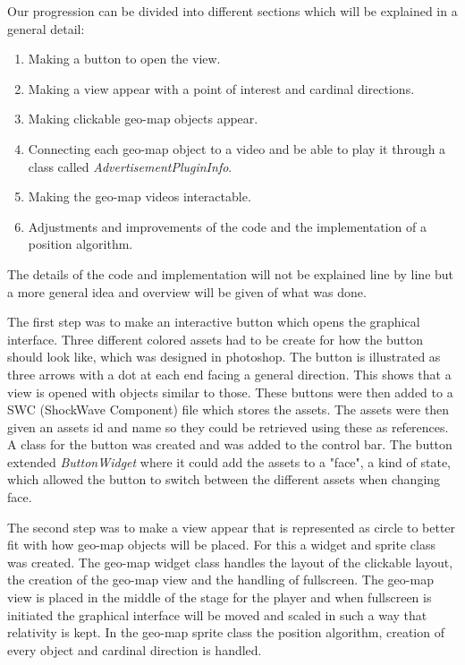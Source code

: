 Our progression can be divided into different sections which will be explained in a general detail:

\begin{enumerate}
\item Making a button to open the view.

\item Making a view appear with a point of interest and cardinal directions.

\item Making clickable geo-map objects appear.

\item Connecting each geo-map object to a video and be able to play it through a class called \textit{AdvertisementPluginInfo}.

\item Making the geo-map videos interactable.


\item Adjustments and improvements of the code and the implementation of a position algorithm. 
\end{enumerate}

The details of the code and implementation will not be explained line by line but a more general idea and overview will be given of what was done.

The first step was to make an interactive button which opens the graphical interface. Three different colored assets had to be create for how the button should look like, which was designed in photoshop. The button is illustrated as three arrows with a dot at each end facing a general direction. This shows that a view is opened with objects similar to those. These buttons were then added to a SWC (ShockWave Component) file which stores the assets. The assets were then given an assets id and name so they could be retrieved using these as references. A class for the button was created and was added to the control bar. The button extended \textit{ButtonWidget} where it could add the assets to a "face", a kind of state, which allowed the button to switch between the different assets when changing face. 

The second step was to make a view appear that is represented as circle to better fit with how geo-map objects will be placed. For this a widget and sprite class was created. The geo-map widget class handles the layout of the clickable layout, the creation of the geo-map view and the handling of fullscreen. The geo-map view is placed in the middle of the stage for the player and when fullscreen is initiated the graphical interface will be moved and scaled in such a way that relativity is kept. In the geo-map sprite class the position algorithm, creation of every object and cardinal direction is handled.

